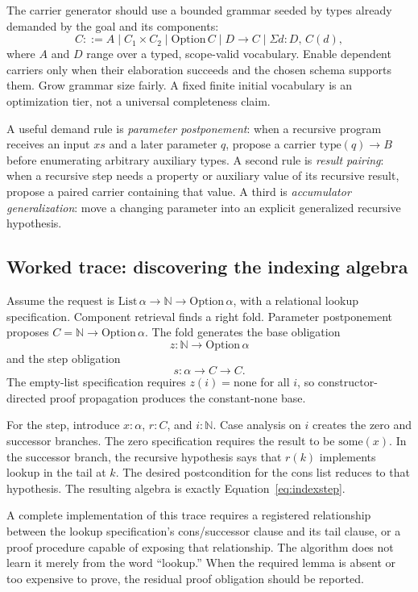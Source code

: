 \documentclass[11pt,letterpaper]{article}
\theoremstyle{definition}
\theoremstyle{remark}
\begin{document}
The carrier generator should use a bounded grammar seeded by types already demanded by the goal and its components:
\[
 C ::= A \mid C_1\times C_2 \mid \mathrm{Option}\,C
       \mid D\to C \mid \Sigma d:D,\,C(d),
\]
where $A$ and $D$ range over a typed, scope-valid vocabulary. Enable dependent carriers only when their elaboration succeeds and the chosen schema supports them. Grow grammar size fairly. A fixed finite initial vocabulary is an optimization tier, not a universal completeness claim.

A useful demand rule is \emph{parameter postponement}: when a recursive program receives an input $xs$ and a later parameter $q$, propose a carrier $\mathrm{type}(q)\to B$ before enumerating arbitrary auxiliary types. A second rule is \emph{result pairing}: when a recursive step needs a property or auxiliary value of its recursive result, propose a paired carrier containing that value. A third is \emph{accumulator generalization}: move a changing parameter into an explicit generalized recursive hypothesis.

\subsection{Worked trace: discovering the indexing algebra}

Assume the request is $\mathrm{List}\,\alpha\to\mathbb N\to\mathrm{Option}\,\alpha$, with a relational lookup specification. Component retrieval finds a right fold. Parameter postponement proposes $C=\mathbb N\to\mathrm{Option}\,\alpha$. The fold generates the base obligation
\[
 z:\mathbb N\to\mathrm{Option}\,\alpha
\]
and the step obligation
\[
 s:\alpha\to C\to C.
\]
The empty-list specification requires $z(i)=\mathrm{none}$ for all $i$, so constructor-directed proof propagation produces the constant-none base.

For the step, introduce $x:\alpha$, $r:C$, and $i:\mathbb N$. Case analysis on $i$ creates the zero and successor branches. The zero specification requires the result to be $\mathrm{some}(x)$. In the successor branch, the recursive hypothesis says that $r(k)$ implements lookup in the tail at $k$. The desired postcondition for the cons list reduces to that hypothesis. The resulting algebra is exactly Equation~\eqref{eq:indexstep}.

A complete implementation of this trace requires a registered relationship between the lookup specification's cons/successor clause and its tail clause, or a proof procedure capable of exposing that relationship. The algorithm does not learn it merely from the word ``lookup.'' When the required lemma is absent or too expensive to prove, the residual proof obligation should be reported.
\end{document}
